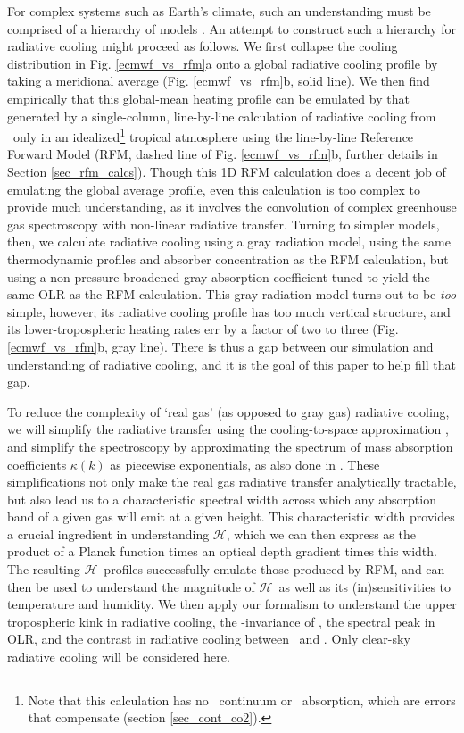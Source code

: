 \documentclass[10pt]{article}
\newcommand{\ch}{\ensuremath{\mathcal{H}}}
\begin{document}
For complex systems such as Earth's climate, such an understanding must be comprised of a hierarchy of models \citep{jeevanjee2017a,held2005}. An attempt to construct such a hierarchy for radiative cooling might proceed as follows. We first collapse the cooling distribution in Fig. \ref{ecmwf_vs_rfm}a onto a global radiative cooling profile by taking a meridional average (Fig. \ref{ecmwf_vs_rfm}b, solid line). We then find empirically that this global-mean heating profile can be emulated by that generated by a single-column, line-by-line calculation of radiative cooling from \htwo\ only in an idealized\footnote{Note that this calculation has no \htwo\ continuum or \cotwo\ absorption, which are errors that compensate (section \ref{sec_cont_co2}).} tropical atmosphere using the line-by-line Reference Forward Model (RFM, dashed line of Fig. \ref{ecmwf_vs_rfm}b,  further details in Section \ref{sec_rfm_calcs}).  Though this 1D RFM calculation does a decent job of emulating the global average profile,  even this calculation is too complex to provide much understanding, as it involves the convolution of complex greenhouse gas spectroscopy with non-linear radiative transfer. Turning to simpler models, then, we calculate radiative cooling using a gray radiation model, using the same thermodynamic profiles and absorber concentration as the RFM calculation, but using a non-pressure-broadened gray absorption coefficient tuned to yield the same OLR as the RFM calculation. This gray radiation model turns out to be \emph{too} simple, however;  its radiative cooling profile has too much vertical structure, and its lower-tropospheric heating rates err by a factor of two to three (Fig. \ref{ecmwf_vs_rfm}b, gray line). There is thus a gap between our simulation and understanding of radiative cooling, and it is the goal of this paper to help fill that gap.

To reduce the complexity of `real gas' (as opposed to gray gas) radiative cooling, we will simplify the radiative transfer using  the cooling-to-space approximation \citep[e.g.][]{petty2006}, and simplify the spectroscopy by approximating the spectrum of mass absorption coefficients $\kappa(k)$ as piecewise exponentials, 
as also done in \cite{wilson2012}. These simplifications not only make the real gas radiative transfer analytically tractable, but also lead us to a characteristic spectral width across which any absorption band of a given gas will emit at a given height. This characteristic width provides a crucial  ingredient in understanding \ch, which we can then express  as the product of a Planck function times an optical depth gradient times this width. The resulting \ch\ profiles successfully emulate those produced by RFM, and can then be used to understand the magnitude of \ch\ as well as its  (in)sensitivities to temperature and humidity. We then apply our formalism  to understand the upper tropospheric kink in radiative cooling, the \Ts-invariance of \cite{jeevanjee2018},  the spectral peak in OLR, and the contrast in radiative cooling between \htwo\ and \cotwo. Only clear-sky radiative cooling will be considered here.
\end{document}
